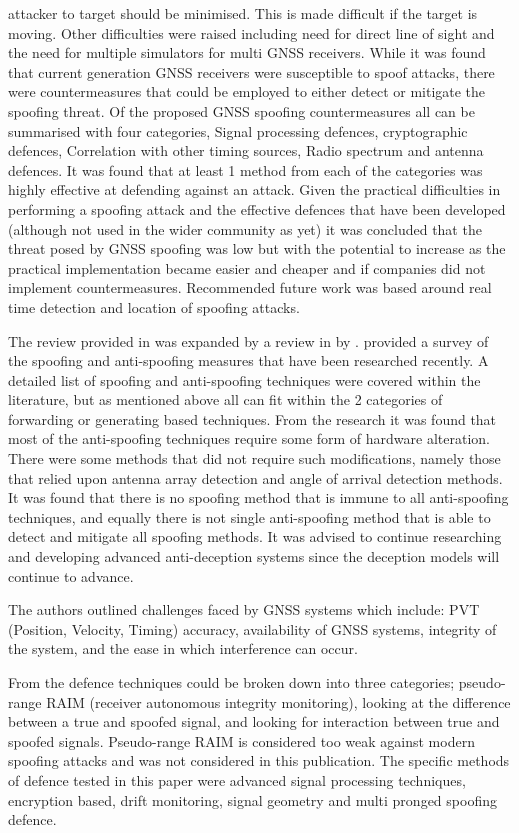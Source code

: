 attacker to target should be minimised. This is made difficult if the target is moving. Other difficulties were raised including need for direct line of sight and the need for
multiple simulators for multi GNSS receivers. 
While it was found that current generation GNSS receivers were susceptible to spoof attacks, there were countermeasures that could be employed to either detect or
mitigate the spoofing threat. Of the proposed GNSS spoofing countermeasures all can be summarised with four categories, Signal processing defences, cryptographic
defences, Correlation with other timing sources, Radio spectrum and antenna defences. It was found that at least 1 method from each of the categories was highly effective
at defending against an attack. Given the practical difficulties in performing a spoofing attack and the effective defences that have been developed (although not used in
the wider community as yet) it was concluded that the threat posed by GNSS spoofing was low but with the potential to increase as the practical implementation became
easier and cheaper and if companies did not implement countermeasures.
Recommended future work was based around real time detection and location of spoofing attacks.

The review provided in \cite{RN32} was expanded by a review in \citeyear{RN33} by \textcite{RN33}. \citeauthor{RN33} provided a survey of the spoofing and anti-spoofing
measures that have been researched recently. A detailed list of spoofing and anti-spoofing techniques were covered within the
literature, but as mentioned above all can fit within the 2 categories of forwarding or generating based techniques. From the research it was found that most of the
anti-spoofing techniques require some form of hardware alteration. There were some methods that did not require such modifications, namely those that relied upon antenna
array detection and angle of arrival detection methods. It was found that there is no spoofing method that is immune to all anti-spoofing techniques, and equally there
is not single anti-spoofing method that is able to detect and mitigate all spoofing methods. It was advised to continue researching and developing advanced anti-deception
systems since the deception models will continue to advance. 

The authors outlined challenges faced by GNSS systems which include: PVT (Position, Velocity, Timing) accuracy, availability of GNSS systems, integrity of the system, and the ease in which
interference can occur. 

From \cite{RN12} the defence techniques could be broken down into three categories; pseudo-range RAIM (receiver autonomous integrity monitoring),
looking at the difference between a true and spoofed signal, and looking for interaction between true and spoofed signals. Pseudo-range RAIM is considered
too weak against modern spoofing attacks and was not considered in this publication. The specific methods of defence tested in this paper  
were advanced signal processing techniques, encryption based, drift monitoring, signal geometry and multi pronged spoofing defence.

